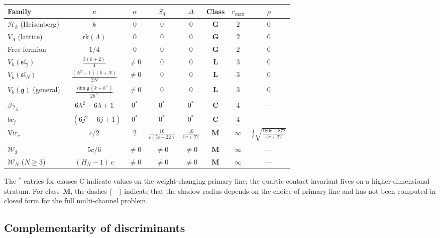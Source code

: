 \documentclass[11pt]{article}
\theoremstyle{plain}
\theoremstyle{definition}
\theoremstyle{remark}
\newcommand{\fg}{\mathfrak{g}}
\newcommand{\cH}{\mathcal{H}}
\newcommand{\cW}{\mathcal{W}}
\begin{document}
\begin{center}
\renewcommand{\arraystretch}{1.4}
\small
\begin{tabular}{lccccccc}
\toprule
Family & $\kappa$ & $\alpha$ & $S_4$ & $\Delta$
 & Class & $r_{\max}$ & $\rho$ \\
\midrule
$\cH_k$ (Heisenberg)
 & $k$ & $0$ & $0$ & $0$ & $\mathbf{G}$ & $2$ & $0$ \\[2pt]
$V_\Lambda$ (lattice)
 & $\mathrm{rk}(\Lambda)$ & $0$ & $0$ & $0$
 & $\mathbf{G}$ & $2$ & $0$ \\[2pt]
Free fermion
 & $1/4$ & $0$ & $0$ & $0$
 & $\mathbf{G}$ & $2$ & $0$ \\[2pt]
\addlinespace
$V_k(\mathfrak{sl}_2)$
 & $\frac{3(k{+}2)}{4}$ & $\neq 0$ & $0$ & $0$
 & $\mathbf{L}$ & $3$ & $0$ \\[2pt]
$V_k(\mathfrak{sl}_N)$
 & $\frac{(N^2{-}1)(k{+}N)}{2N}$ & $\neq 0$ & $0$ & $0$
 & $\mathbf{L}$ & $3$ & $0$ \\[2pt]
$V_k(\fg)$ (general)
 & $\frac{\dim\fg\,(k{+}h^\vee)}{2h^\vee}$ & $\neq 0$ & $0$ & $0$
 & $\mathbf{L}$ & $3$ & $0$ \\[2pt]
\addlinespace
$\beta\gamma_\lambda$
 & $6\lambda^2{-}6\lambda{+}1$ & $0^*$ & $0^*$ & $0^*$
 & $\mathbf{C}$ & $4$ & --- \\[2pt]
$bc_j$
 & $-(6j^2{-}6j{+}1)$ & $0^*$ & $0^*$ & $0^*$
 & $\mathbf{C}$ & $4$ & --- \\[2pt]
\addlinespace
$\mathrm{Vir}_c$
 & $c/2$ & $2$ & $\frac{10}{c(5c{+}22)}$
 & $\frac{40}{5c{+}22}$
 & $\mathbf{M}$ & $\infty$
 & $\frac{1}{c}\!\sqrt{\frac{180c{+}872}{5c{+}22}}$ \\[4pt]
$\cW_3$
 & $5c/6$ & $\neq 0$ & $\neq 0$ & $\neq 0$
 & $\mathbf{M}$ & $\infty$ & --- \\[2pt]
$\cW_N$ ($N{\geq}3$)
 & $(H_N{-}1)\,c$ & $\neq 0$ & $\neq 0$ & $\neq 0$
 & $\mathbf{M}$ & $\infty$ & --- \\[2pt]
\bottomrule
\end{tabular}
\end{center}

\noindent The ${}^*$ entries for classes C indicate values
on the weight-changing primary line; the quartic contact
invariant lives on a higher-dimensional stratum.
For class~$\mathbf{M}$, the dashes (---) indicate that the
shadow radius depends on the choice of primary line and has
not been computed in closed form for the full multi-channel
problem.


\subsection{Complementarity of discriminants}
\label{subsec:complementarity}
\end{document}
